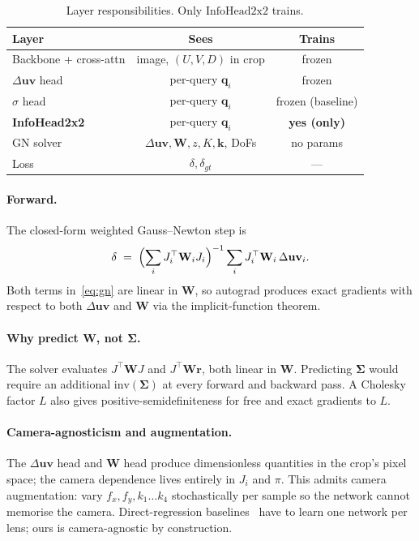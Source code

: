 \documentclass[10pt,conference,a4paper]{IEEEtran}
\newcommand{\Suv}{\Delta\mathbf{uv}}
\newcommand{\W}{\mathbf{W}}
\newcommand{\Sig}{\boldsymbol{\Sigma}}
\begin{document}
\begin{table}[t]
\centering
\caption{Layer responsibilities. Only $\mathrm{InfoHead2x2}$ trains.}
\label{tab:resp}
\begin{tabular}{lcc}
\toprule
Layer                  & Sees                              & Trains \\
\midrule
Backbone + cross-attn  & image, $(U,V,D)$ in crop          & frozen \\
$\Suv$ head            & per-query $\mathbf{q}_i$          & frozen \\
$\sigma$ head          & per-query $\mathbf{q}_i$          & frozen (baseline) \\
\textbf{InfoHead2x2}   & per-query $\mathbf{q}_i$          & \textbf{yes (only)} \\
GN solver              & $\Suv,\W,z,K,\mathbf{k}$, DoFs    & no params \\
Loss                   & $\delta, \delta_{gt}$             & --- \\
\bottomrule
\end{tabular}
\end{table}

\paragraph{Forward.}
The closed-form weighted Gauss--Newton step is
%
\begin{equation}
\delta \;=\; \Bigl(\sum_i J_i^\top \W_i J_i\Bigr)^{-1}
             \sum_i J_i^\top \W_i \,\Suv_i.
\label{eq:gn}
\end{equation}
%
Both terms in~\eqref{eq:gn} are linear in $\W$, so autograd produces
exact gradients with respect to both $\Suv$ and $\W$ via the
implicit-function theorem.

\paragraph{Why predict $\W$, not $\Sig$.}
The solver evaluates $J^\top\W J$ and $J^\top\W \mathbf{r}$, both
linear in $\W$. Predicting $\Sig$ would require an additional
$\mathrm{inv}(\Sig)$ at every forward and backward pass.
A Cholesky factor $L$ also gives positive-semidefiniteness for
free and exact gradients to $L$.

\paragraph{Camera-agnosticism and augmentation.}
The $\Suv$ head and $\W$ head produce dimensionless quantities in the
crop's pixel space; the camera dependence lives entirely in $J_i$ and
$\pi$. This admits camera augmentation: vary $f_x, f_y, k_1\ldots k_4$
stochastically per sample so the network cannot memorise the camera.
Direct-regression baselines~\cite{iyer2018calibnet,schneider2017regnet,lv2021lccnet,shi2020netcalib}
have to learn one network per lens; ours is camera-agnostic by
construction.
\end{document}
